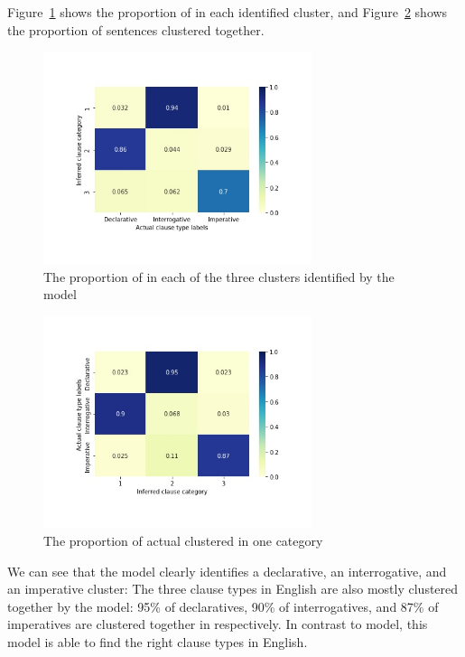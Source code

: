 Figure~\ref{fig:target-heatmap} shows the proportion of \diis{} in each identified cluster, and Figure~\ref{fig:target-heatrev} shows the proportion of sentences clustered together. 
\begin{figure}[H]
    \centering
    \includegraphics[width=0.7\textwidth]{figures/target-heatmap.jpg}
    \caption{The proportion of \diis{} in each of the three clusters identified by the \plearnerabbr{} model}
    \label{fig:target-heatmap}
\end{figure}




\begin{figure}[H]
    \centering
    \includegraphics[width=0.7\textwidth]{figures/target-heatrev.jpg}
    \caption{The proportion of actual \diis{} clustered in one category}
    \label{fig:target-heatrev}
\end{figure}


We can see that the \plearnerabbr{} model clearly identifies a declarative, an interrogative, and an imperative cluster:  The three clause types in English are also mostly clustered together by the model: 95\% of declaratives, 90\% of interrogatives, and 87\% of imperatives are clustered together in  respectively. In contrast to \dlearnerabbr{} model, this model is able to find the right clause types in English.


